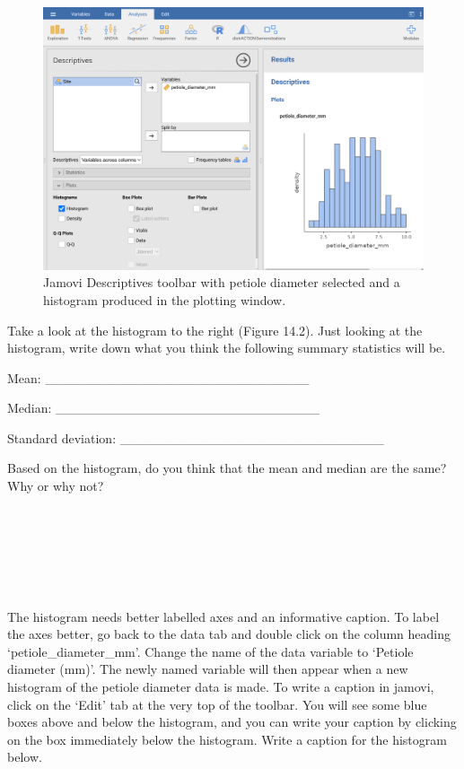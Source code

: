 \documentclass[
  openany]{scrbook}
\begin{document}
\begin{figure}
\includegraphics[width=1\linewidth]{img/lilypad_histogram} \caption{Jamovi Descriptives toolbar with petiole diameter selected and a histogram produced in the plotting window.}\label{fig:unnamed-chunk-47}
\end{figure}

Take a look at the histogram to the right (Figure 14.2).
Just looking at the histogram, write down what you think the following summary statistics will be.

Mean: \_\_\_\_\_\_\_\_\_\_\_\_\_\_\_\_\_\_\_\_\_\_\_\_\_\_\_\_

Median: \_\_\_\_\_\_\_\_\_\_\_\_\_\_\_\_\_\_\_\_\_\_\_\_\_\_\_\_

Standard deviation: \_\_\_\_\_\_\_\_\_\_\_\_\_\_\_\_\_\_\_\_\_\_\_\_\_\_\_\_

Based on the histogram, do you think that the mean and median are the same? Why or why not?

\begin{verbatim}






\end{verbatim}

The histogram needs better labelled axes and an informative caption.
To label the axes better, go back to the data tab and double click on the column heading `petiole\_diameter\_mm'.
Change the name of the data variable to `Petiole diameter (mm)'.
The newly named variable will then appear when a new histogram of the petiole diameter data is made.
To write a caption in jamovi, click on the `Edit' tab at the very top of the toolbar.
You will see some blue boxes above and below the histogram, and you can write your caption by clicking on the box immediately below the histogram.
Write a caption for the histogram below.
\end{document}
